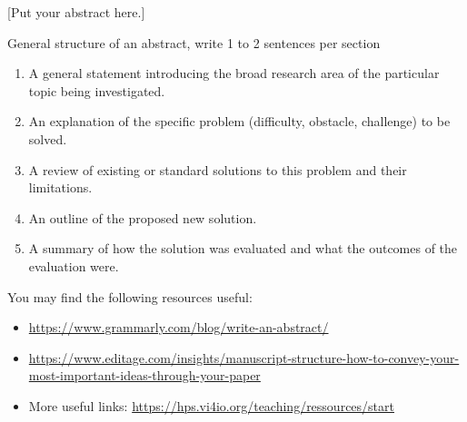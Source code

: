 [Put your abstract here.]

\medskip

General structure of an abstract, write 1 to 2 sentences per section
\begin{enumerate}
	\item  A general statement introducing the broad research area of the particular topic being investigated.
	\item  An explanation of the specific problem (difficulty, obstacle, challenge) to be solved.
	\item  A review of existing or standard solutions to this problem and their limitations.
	\item  An outline of the proposed new solution.
	\item  A summary of how the solution was evaluated and what the outcomes of the evaluation were.
\end{enumerate}

You may find the following resources useful:
\begin{itemize}
	\item \url{https://www.grammarly.com/blog/write-an-abstract/}
	\item \url{https://www.editage.com/insights/manuscript-structure-how-to-convey-your-most-important-ideas-through-your-paper}
	\item More useful links: \url{https://hps.vi4io.org/teaching/ressources/start}
\end{itemize}
